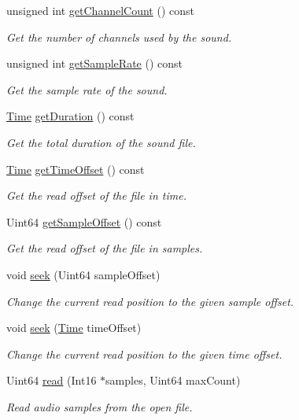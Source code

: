 \begin{DoxyCompactItemize}
unsigned int \mbox{\hyperlink{classsf_1_1_input_sound_file_a54307c308ba05dea63aba54a29c804a4}{get\+Channel\+Count}} () const
\begin{DoxyCompactList}\small\item\em Get the number of channels used by the sound. \end{DoxyCompactList}\item 
unsigned int \mbox{\hyperlink{classsf_1_1_input_sound_file_a6b8177e40dd8020752f6d52f96b774c3}{get\+Sample\+Rate}} () const
\begin{DoxyCompactList}\small\item\em Get the sample rate of the sound. \end{DoxyCompactList}\item 
\mbox{\hyperlink{classsf_1_1_time}{Time}} \mbox{\hyperlink{classsf_1_1_input_sound_file_aa081bd4d9732408d10b48227a360778e}{get\+Duration}} () const
\begin{DoxyCompactList}\small\item\em Get the total duration of the sound file. \end{DoxyCompactList}\item 
\mbox{\hyperlink{classsf_1_1_time}{Time}} \mbox{\hyperlink{classsf_1_1_input_sound_file_ad1a2238acb734d8b1144ecd75cccc2e7}{get\+Time\+Offset}} () const
\begin{DoxyCompactList}\small\item\em Get the read offset of the file in time. \end{DoxyCompactList}\item 
Uint64 \mbox{\hyperlink{classsf_1_1_input_sound_file_a73a99f159e8aca6e39478f6cf686d7ad}{get\+Sample\+Offset}} () const
\begin{DoxyCompactList}\small\item\em Get the read offset of the file in samples. \end{DoxyCompactList}\item 
void \mbox{\hyperlink{classsf_1_1_input_sound_file_aaf97be15020a42e159ff88f76f22af20}{seek}} (Uint64 sample\+Offset)
\begin{DoxyCompactList}\small\item\em Change the current read position to the given sample offset. \end{DoxyCompactList}\item 
void \mbox{\hyperlink{classsf_1_1_input_sound_file_a8eee7af58ad75ddc61f93ad72e2d66c1}{seek}} (\mbox{\hyperlink{classsf_1_1_time}{Time}} time\+Offset)
\begin{DoxyCompactList}\small\item\em Change the current read position to the given time offset. \end{DoxyCompactList}\item 
Uint64 \mbox{\hyperlink{classsf_1_1_input_sound_file_a83d6f64617456601edeb0daf9d14a17f}{read}} (Int16 $\ast$samples, Uint64 max\+Count)
\begin{DoxyCompactList}\small\item\em Read audio samples from the open file. \end{DoxyCompactList}\end{DoxyCompactItemize}
